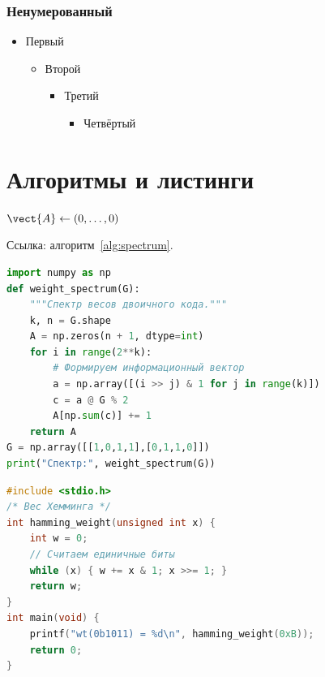 \documentclass[font=modern]{cmcmsuthesis-phd}
\begin{document}
\subsection{Ненумерованный}
\begin{itemize}\item Первый\begin{itemize}\item Второй\begin{itemize}\item Третий\begin{itemize}\item Четвёртый\end{itemize}\end{itemize}\end{itemize}\end{itemize}

\chapter{Алгоритмы и листинги}

\begin{algorithm}[H]\caption{Вычисление спектра весов}\label{alg:spectrum}
$\vect{A}\gets(0,\ldots,0)$\;
\;
\end{algorithm}
Ссылка: алгоритм~\ref{alg:spectrum}.

\begin{lstlisting}[language=Python,caption={Python},label={lst:py}]
import numpy as np
def weight_spectrum(G):
    """Спектр весов двоичного кода."""
    k, n = G.shape
    A = np.zeros(n + 1, dtype=int)
    for i in range(2**k):
        # Формируем информационный вектор
        a = np.array([(i >> j) & 1 for j in range(k)])
        c = a @ G % 2
        A[np.sum(c)] += 1
    return A
G = np.array([[1,0,1,1],[0,1,1,0]])
print("Спектр:", weight_spectrum(G))
\end{lstlisting}

\begin{lstlisting}[language=C,caption={C},label={lst:c}]
#include <stdio.h>
/* Вес Хемминга */
int hamming_weight(unsigned int x) {
    int w = 0;
    // Считаем единичные биты
    while (x) { w += x & 1; x >>= 1; }
    return w;
}
int main(void) {
    printf("wt(0b1011) = %d\n", hamming_weight(0xB));
    return 0;
}
\end{lstlisting}
\end{document}
